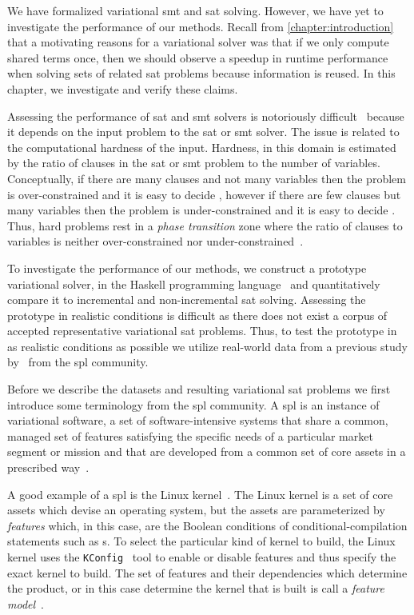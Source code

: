 \label{chapter:case-studies}
%
We have formalized variational \ac{smt} and \ac{sat} solving. However, we have
yet to investigate the performance of our methods. Recall from
\autoref{chapter:introduction} that a motivating reasons for a variational
solver was that if we only compute shared terms once, then we should observe a
speedup in runtime performance when solving sets of related \ac{sat} problems
because information is reused. In this chapter, we investigate and verify these
claims.

Assessing the performance of \ac{sat} and \ac{smt} solvers is notoriously
difficult~\cite{Gent94thesat} because it depends on the input problem to the
\ac{sat} or \ac{smt} solver. The issue is related to the computational hardness
of the input. Hardness, in this domain is estimated by the ratio of clauses in
the \ac{sat} or \ac{smt} problem to the number of variables. Conceptually, if
there are many clauses and not many variables then the problem is
over-constrained and it is easy to decide , however if there are few
clauses but many variables then the problem is under-constrained and it is easy
to decide . Thus, hard problems rest in a \emph{phase transition} zone
where the ratio of clauses to variables is neither over-constrained nor
under-constrained~\cite{Gent94thesat}.

To investigate the performance of our methods, we construct a prototype
variational solver, \vsat{} in the Haskell programming
language~\cite{Hudak:1992:RPL:130697.130699} and quantitatively compare it to
incremental and non-incremental \ac{sat} solving. Assessing the prototype in
realistic conditions is difficult as there does not exist a corpus of accepted
representative variational \ac{sat} problems. Thus, to test the prototype in as
realistic conditions as possible we utilize real-world data from a previous
study by~\citet{NMS+:GPCE18} from the \ac{spl} community.

Before we describe the datasets and resulting variational \ac{sat} problems we
first introduce some terminology from the \ac{spl} community. A \ac{spl} is an
instance of variational software, a set of software-intensive systems that share
a common, managed set of features satisfying the specific needs of a particular
market segment or mission and that are developed from a common set of core
assets in a prescribed way~\cite{ABKS13,CE00,PBL05}.

A good example of a \ac{spl} is the Linux kernel~\cite{linux}. The Linux kernel
is a set of core assets which devise an operating system, but the assets are
parameterized by \emph{features} which, in this case, are the Boolean conditions
of conditional-compilation statements such as s. To select the
particular kind of kernel to build, the Linux kernel uses the
\texttt{KConfig}~\cite{kconfig} tool to enable or disable features and thus
specify the exact kernel to build. The set of features and their dependencies
which determine the product, or in this case determine the kernel that is built
is call a \emph{feature model}~\cite{KCHNP90}.

